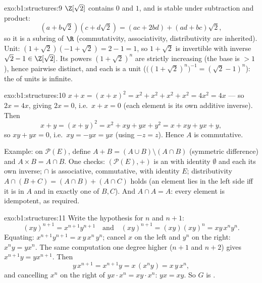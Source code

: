\begin{solution}{exo:b1:structures:9}
$\Z[\sqrt 2]$ contains $0$ and $1$, and is stable under subtraction
and product:
\[
(a + b\sqrt 2)(c + d\sqrt 2) = (ac + 2bd) + (ad + bc)\sqrt 2 ,
\]
so it is a subring of $\R$ (commutativity, associativity,
distributivity are inherited). Unit: $(1 + \sqrt 2)(-1 + \sqrt 2) =
2 - 1 = 1$, so $1 + \sqrt 2$ is invertible with inverse $\sqrt 2 - 1
\in \Z[\sqrt 2]$. Its powers $(1 + \sqrt 2)^n$ are strictly
increasing (the base is $> 1$), hence pairwise distinct, and each is
a unit ($\bigl((1+\sqrt2)^n\bigr)^{-1} = (\sqrt 2 - 1)^n$): the 
of units is infinite.
\end{solution}

\begin{solution}{exo:b1:structures:10}
$x + x = (x + x)^2 = x^2 + x^2 + x^2 + x^2 = 4x^2 = 4x$ --- so $2x =
4x$, giving $2x = 0$, i.e.\ $x + x = 0$ (each element is its own
additive inverse). Then
\[
x + y = (x+y)^2 = x^2 + xy + yx + y^2 = x + xy + yx + y ,
\]
so $xy + yx = 0$, i.e.\ $xy = -yx = yx$ (using $-z = z$). Hence $A$ is
commutative.

Example: on $\mathcal{P}(E)$, define $A + B = (A \cup B) \setminus (A
\cap B)$ (symmetric difference) and $A \times B = A \cap B$. One
checks: $(\mathcal{P}(E), +)$ is an  with identity
$\emptyset$ and each  its own inverse; $\cap$ is associative,
commutative, with identity $E$; distributivity $A \cap (B + C) = (A
\cap B) + (A \cap C)$ holds (an element lies in the left side iff it
is in $A$ and in exactly one of $B, C$). And $A \cap A = A$: every
element is idempotent, as required.
\end{solution}

\begin{solution}{exo:b1:structures:11}
Write the hypothesis for $n$ and $n+1$:
\[
(xy)^{n+1} = x^{n+1} y^{n+1}
\quad\text{and}\quad
(xy)^{n+1} = (xy)(xy)^n = xy\,x^n y^n .
\]
Equating: $x^{n+1} y^{n+1} = x\,y\,x^n\,y^n$; cancel $x$ on the left
and $y^n$ on the right: $x^n y = y x^n$. The same computation one
degree higher ($n+1$ and $n+2$) gives $x^{n+1} y = y x^{n+1}$. Then
\[
y\,x^{n+1} = x^{n+1} y = x\,(x^n y) = x\,y\,x^n ,
\]
and cancelling $x^n$ on the right of $y x \cdot x^n = x y \cdot x^n$:
$yx = xy$. So $G$ is .
\end{solution}

